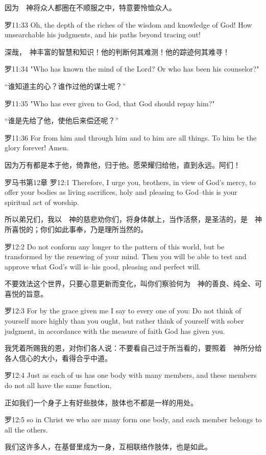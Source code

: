 \documentclass[a4paper,11pt,onecolumn,twoside]{ctexart}
\begin{document}
\begin{multicols}{2}
 因为　神将众人都圈在不顺服之中，特意要怜恤众人。


 罗11:33
 Oh, the depth of the riches of the wisdom and knowledge of God! How unsearchable his judgments, and his paths beyond tracing out!

 深哉，　神丰富的智慧和知识！他的判断何其难测！他的踪迹何其难寻！


 罗11:34
 "Who has known the mind of the Lord? Or who has been his counselor?"

 “谁知道主的心？谁作过他的谋士呢？”


 罗11:35
 "Who has ever given to God, that God should repay him?"

 “谁是先给了他，使他后来偿还呢？”


 罗11:36
 For from him and through him and to him are all things. To him be the glory forever! Amen.

 因为万有都是本于他，倚靠他，归于他。愿荣耀归给他，直到永远。阿们！


 罗马书第12章
 罗12:1
 Therefore, I urge you, brothers, in view of God's mercy, to offer your bodies as living sacrifices, holy and pleasing to God--this is your spiritual act of worship.

 所以弟兄们，我以　神的慈悲劝你们，将身体献上，当作活祭，是圣洁的，是　神所喜悦的；你们如此事奉，乃是理所当然的。


 罗12:2
 Do not conform any longer to the pattern of this world, but be transformed by the renewing of your mind. Then you will be able to test and approve what God's will is--his good, pleasing and perfect will.

 不要效法这个世界，只要心意更新而变化，叫你们察验何为　神的善良、纯全、可喜悦的旨意。


 罗12:3
 For by the grace given me I say to every one of you: Do not think of yourself more highly than you ought, but rather think of yourself with sober judgment, in accordance with the measure of faith God has given you.

 我凭着所赐我的恩，对你们各人说：不要看自己过于所当看的，要照着　神所分给各人信心的大小，看得合乎中道。


 罗12:4
 Just as each of us has one body with many members, and these members do not all have the same function,

 正如我们一个身子上有好些肢体，肢体也不都是一样的用处。


 罗12:5
 so in Christ we who are many form one body, and each member belongs to all the others.

 我们这许多人，在基督里成为一身，互相联络作肢体，也是如此。



\end{multicols}
\end{document}
